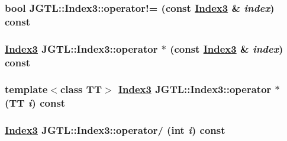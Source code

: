 \hypertarget{class_j_g_t_l_1_1_index3_85560dbad6aa0d284112b99a59e58fb4}{
\subsubsection[operator"!=]{\setlength{\rightskip}{0pt plus 5cm}bool JGTL::Index3::operator!= (const \hyperlink{class_j_g_t_l_1_1_index3}{Index3} \& {\em index}) const}}
\label{class_j_g_t_l_1_1_index3_85560dbad6aa0d284112b99a59e58fb4}


\hypertarget{class_j_g_t_l_1_1_index3_095316d8fa8a9df4f70882eacbf2d98f}{
\subsubsection[operator $\ast$]{\setlength{\rightskip}{0pt plus 5cm}\hyperlink{class_j_g_t_l_1_1_index3}{Index3} JGTL::Index3::operator $\ast$ (const \hyperlink{class_j_g_t_l_1_1_index3}{Index3} \& {\em index}) const}}
\label{class_j_g_t_l_1_1_index3_095316d8fa8a9df4f70882eacbf2d98f}


\hypertarget{class_j_g_t_l_1_1_index3_68651bf3c423c5404e8dee156b5ad209}{
\subsubsection[operator $\ast$]{\setlength{\rightskip}{0pt plus 5cm}template$<$class TT$>$ \hyperlink{class_j_g_t_l_1_1_index3}{Index3} JGTL::Index3::operator $\ast$ (TT {\em i}) const}}
\label{class_j_g_t_l_1_1_index3_68651bf3c423c5404e8dee156b5ad209}


\hypertarget{class_j_g_t_l_1_1_index3_9ed9d700039569d2a90bb9d3274c4ddf}{
\subsubsection[operator/]{\setlength{\rightskip}{0pt plus 5cm}\hyperlink{class_j_g_t_l_1_1_index3}{Index3} JGTL::Index3::operator/ (int {\em i}) const}}
\label{class_j_g_t_l_1_1_index3_9ed9d700039569d2a90bb9d3274c4ddf}


